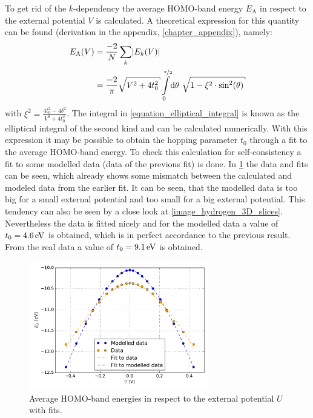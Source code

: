\newpage To get rid of the $k$-dependency the average HOMO-band energy $E_\text{A}$ in respect to the external potential $V$ is calculated. A theoretical expression for this quantity can be found (derivation in the appendix, \cref{chapter_appendix}), namely:
\begin{align}
	E_\text{A}(V) &= \frac{-2}{N}\sum_k \left|E_k(V)\right|\\
				  &= \frac{-2}{\pi}\sqrt{V^2+4t_0^2}\int\limits_0^{\nicefrac{\pi}{2}}\dd\theta\ \sqrt{1-\xi^2\cdot\sin^2(\theta)}
				  \label{equation_elliptical_integral}
\end{align}
with $\xi^2 = \frac{4t_0^2-4\delta^2}{V^2+4t_0^2}$. The integral in \cref{equation_elliptical_integral} is known as the elliptical integral of the second kind and can be calculated numerically. With this expression it may be possible to obtain the hopping parameter $t_0$ through a fit to the average HOMO-band energy. To check this calculation for self-consistency a fit to some modelled data (data of the previous fit) is done. In \cref{image_hydrogen_homo_energy_charging} the data and fits can be seen, which already shows some mismatch between the calculated and modeled data from the earlier fit. It can be seen, that the modelled data is too big for a small external potential and too small for a big external potential. This tendency can also be seen by a close look at \cref{image_hydrogen_3D_slices}.\\
Nevertheless the data is fitted nicely and for the modelled data a value of $t_0 = \unit[4.6]{eV}$ is obtained, which is in perfect accordance to the previous result. From the real data a value of $t_0 = \unit[9.1]{eV}$ is obtained.\\
\begin{figure}[]
	\centering
	\includegraphics[width = 0.7\textwidth]{Images/Hydrogen/charging/Homo_energy_charge}
	\caption{Average HOMO-band energies in respect to the external potential $U$ with fits.}
	\label{image_hydrogen_homo_energy_charging}
\end{figure}
